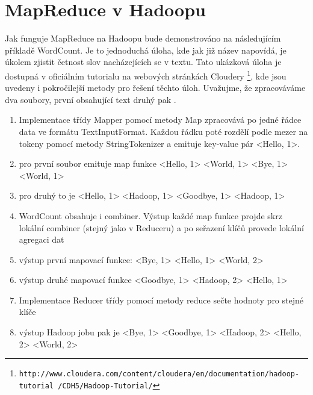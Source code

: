 \documentclass[thesis=M,czech]{FITthesis}[2012/06/26]
\begin{document}
\section{MapReduce v Hadoopu}
Jak funguje MapReduce na Hadoopu bude demonstrováno na následujícím příkladě WordCount. Je to jednoduchá úloha, kde jak již název napovídá, je úkolem zjistit četnost slov nacházejících se v textu. Tato ukázková úloha je dostupná v oficiálním tutorialu na webových stránkách Cloudery \footnote{\texttt{http://www.cloudera.com/content/cloudera/en/documentation/hadoop-tutorial /CDH5/Hadoop-Tutorial/}}, kde jsou uvedeny i pokročilejší metody pro řešení těchto úloh. Uvažujme, že zpracováváme dva soubory, první obsahující text   druhý pak .
\begin{enumerate}
\item Implementace třídy Mapper pomocí metody Map zpracovává po jedné řádce data ve formátu TextInputFormat. Každou řádku poté rozdělí podle mezer na tokeny pomocí metody StringTokenizer a emituje key-value pár <Hello, 1>.
\item pro první soubor emituje map funkce <Hello, 1> <World, 1> <Bye, 1> <World, 1>
\item pro druhý to je <Hello, 1> <Hadoop, 1> <Goodbye, 1> <Hadoop, 1>
\item WordCount obsahuje i combiner. Výstup každé map funkce projde skrz lokální combiner (stejný jako v Reduceru) a po seřazení  klíčů provede lokální agregaci dat
\item výstup první mapovací funkce: <Bye, 1> <Hello, 1> <World, 2>
\item výstup druhé mapovací funkce  <Goodbye, 1> <Hadoop, 2> <Hello, 1>
\item Implementace Reducer třídy pomocí metody reduce sečte hodnoty pro stejné klíče
\item výstup Hadoop jobu pak je <Bye, 1> <Goodbye, 1> <Hadoop, 2> <Hello, 2> <World, 2>
\end{enumerate}
\pagebreak
\end{document}
